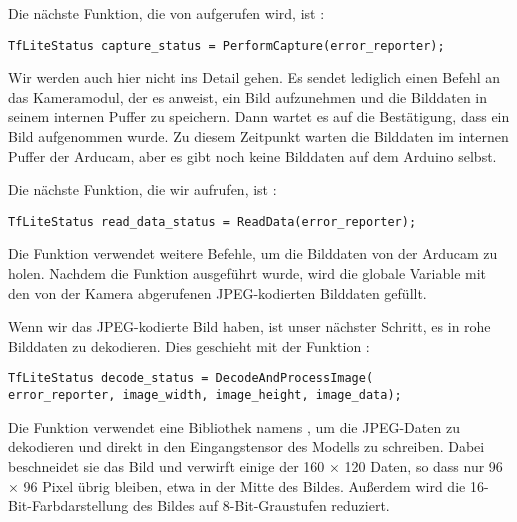 Die nächste Funktion, die von  aufgerufen wird, ist :

\begin{code}
    \begin{lstlisting}
TfLiteStatus capture_status = PerformCapture(error_reporter);
  \end{lstlisting}
\end{code}

Wir werden auch hier nicht ins Detail gehen. Es sendet lediglich einen Befehl an das Kameramodul, der es anweist, ein Bild aufzunehmen und die Bilddaten in seinem internen Puffer zu speichern. Dann wartet es auf die Bestätigung, dass ein Bild aufgenommen wurde. Zu diesem Zeitpunkt warten die Bilddaten im internen Puffer der Arducam, aber es gibt noch keine Bilddaten auf dem Arduino selbst.

Die nächste Funktion, die wir aufrufen, ist :

\begin{code}
    \begin{lstlisting}
TfLiteStatus read_data_status = ReadData(error_reporter);
  \end{lstlisting}
\end{code}

Die Funktion  verwendet weitere Befehle, um die Bilddaten von der Arducam zu holen. Nachdem die Funktion ausgeführt wurde, wird die globale Variable  mit den von der Kamera abgerufenen JPEG-kodierten Bilddaten gefüllt.

Wenn wir das JPEG-kodierte Bild haben, ist unser nächster Schritt, es in rohe Bilddaten zu dekodieren. Dies geschieht mit der Funktion :

\begin{code}
    \begin{lstlisting}
TfLiteStatus decode_status = DecodeAndProcessImage(
error_reporter, image_width, image_height, image_data);
  \end{lstlisting}
\end{code}

Die Funktion verwendet eine Bibliothek namens , um die JPEG-Daten zu dekodieren und direkt in den Eingangstensor des Modells zu schreiben. Dabei beschneidet sie das Bild und verwirft einige der 160 × 120 Daten, so dass nur 96 × 96 Pixel übrig bleiben, etwa in der Mitte des Bildes. Außerdem wird die 16-Bit-Farbdarstellung des Bildes auf 8-Bit-Graustufen reduziert.

